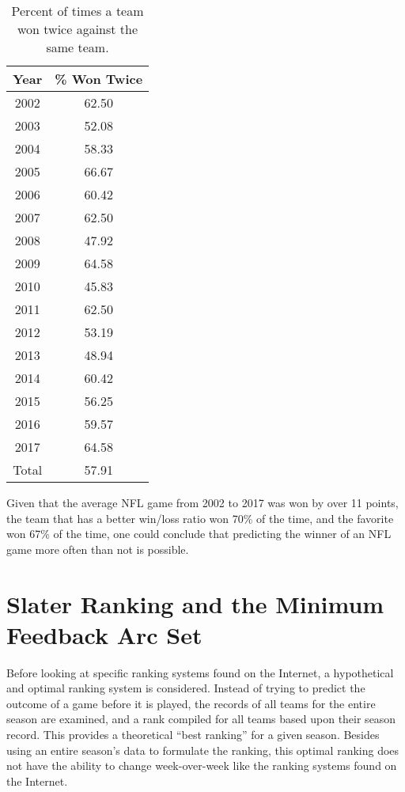 \documentclass[11pt]{article}
\begin{document}
\begin{table}[!htb]
\begin{center}
\scriptsize
\begin{tabular}{|c|c|}
\hline
Year & \% Won Twice\\
\hline
2002 & 62.50\\
2003 & 52.08\\
2004 & 58.33\\
2005 & 66.67\\
2006 & 60.42\\
2007 & 62.50\\
2008 & 47.92\\
2009 & 64.58\\
2010 & 45.83\\
2011 & 62.50\\
2012 & 53.19\\
2013 & 48.94\\
2014 & 60.42\\
2015 & 56.25\\
2016 & 59.57\\
2017 & 64.58\\
\hline
Total & 57.91\\
\hline
\end{tabular}
\caption{Percent of times a team won twice against the same team.}\label{table:won_twice}
\end{center}
\end{table}

Given that the average NFL game from 2002 to 2017 was won by over 11 points, the team that has a better win/loss ratio won 70\% of the time, and the favorite won 67\% of the time, one could conclude that predicting the winner of an NFL game more often than not is possible.

\section{Slater Ranking and the Minimum Feedback Arc Set}\label{sec:slater}

Before looking at specific ranking systems found on the Internet, a hypothetical and optimal ranking system is considered. Instead of trying to predict the outcome of a game before it is played, the records of all teams for the entire season are examined, and a rank compiled for all teams based upon their season record. This provides a theoretical ``best ranking'' for a given season. Besides using an entire season's data to formulate the ranking, this optimal ranking does not have the ability to change week-over-week like the ranking systems found on the Internet.
\end{document}
